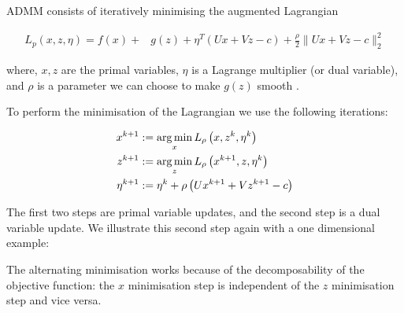 ADMM consists of iteratively minimising the augmented Lagrangian 

\begin{align*}
L_p\left(x, z, \eta\right) = f\left( x\right) +& g\left(z\right)+\eta^T\left(Ux+Vz-c\right) + \frac{\rho}{2}\|Ux+Vz-c\|_2^2
\label{admm_aug_lagrangian}
\end{align*}

where, \(x,z\) are the primal variables, \(\eta\) is a Lagrange multiplier (or dual variable), and \(\rho\) is a parameter we can choose to make \(g(z)\) smooth \cite{nesterov2005smooth}.

To perform the minimisation of the Lagrangian we use the following iterations:

\begin{align}
x^{k+1} &:= \operatorname*{arg\,min}_{x} L_\rho\left(x,z^k,\eta^k\right)\\
z^{k+1} &:= \operatorname*{arg\,min}_{z} L_\rho\left(x^{k+1},z,\eta^k\right)\\
\eta^{k+1} &:= \eta^{k} + \rho \left(Ux^{k+1} + Vz^{k+1} - c\right)
\label{admm_algo}
\end{align}

The first two steps are primal variable updates, and the second step is a dual variable update. We illustrate this second step again with a one dimensional example:

The alternating minimisation works because of the decomposability of the objective function: the \(x\) minimisation step is independent of the \(z\) minimisation step and vice versa.  

